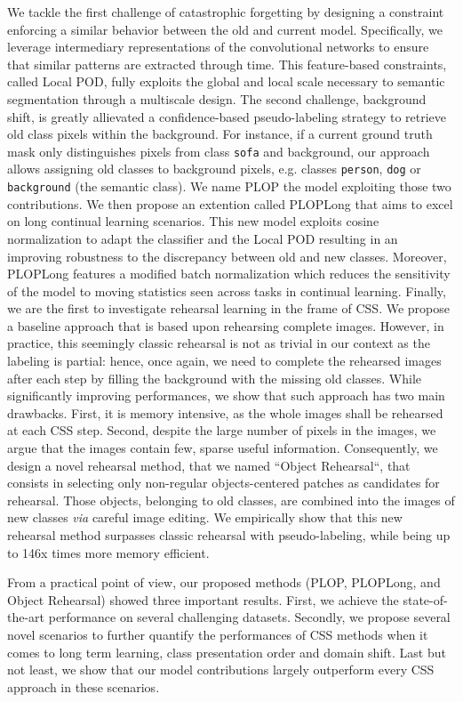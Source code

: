 We tackle the first challenge of catastrophic forgetting by designing a constraint enforcing a
similar behavior between the old and current model. Specifically, we leverage intermediary
representations of the convolutional networks to ensure that similar patterns are extracted through
time. This feature-based constraints, called Local POD, fully exploits the global and local scale
necessary to semantic segmentation through a multiscale design. The second challenge, background
shift, is greatly allievated a confidence-based pseudo-labeling strategy to retrieve old class
pixels within the background. For instance, if a current ground truth mask only distinguishes pixels
from class \texttt{sofa} and background, our approach allows assigning old classes to background
pixels, e.g. classes \texttt{person}, \texttt{dog} or \texttt{background} (the semantic class). We
name PLOP the model exploiting those two contributions. We then propose an extention called PLOPLong
that aims to excel on long continual learning scenarios. This new model exploits cosine
normalization to adapt the classifier and the Local POD resulting in an improving robustness to the
discrepancy between old and new classes. Moreover, PLOPLong features a modified batch normalization
which reduces the sensitivity of the model to moving statistics seen across tasks in continual
learning. Finally, we are the first to investigate rehearsal learning in the frame of \ac{CSS}. We
propose a baseline approach that is based upon rehearsing complete images. However, in practice,
this seemingly classic rehearsal is not as trivial in our context as the labeling is partial: hence,
once again, we need to complete the rehearsed images after each step by filling the background with
the missing old classes. While significantly improving performances, we show that such approach has
two main drawbacks. First, it is memory intensive, as the whole images shall be rehearsed at each
\ac{CSS} step. Second, despite the large number of pixels in the images, we argue that the images contain
few, sparse useful information. Consequently, we design a novel rehearsal method, that we named
``Object Rehearsal``, that consists in selecting only non-regular objects-centered patches as
candidates for rehearsal. Those objects, belonging to old classes, are combined into the images of
new classes \textit{via} careful image editing. We empirically show that this new rehearsal method
surpasses classic rehearsal with pseudo-labeling, while being up to 146x times more memory
efficient.

From a practical point of view, our proposed methods (PLOP, PLOPLong, and Object Rehearsal) showed
three important results. First, we achieve the state-of-the-art performance on several challenging
datasets. Secondly, we propose several novel scenarios to further quantify the performances of \ac{CSS}
methods when it comes to long term learning, class presentation order and domain shift. Last but not
least, we show that our model contributions largely outperform every \ac{CSS} approach in these
scenarios.

